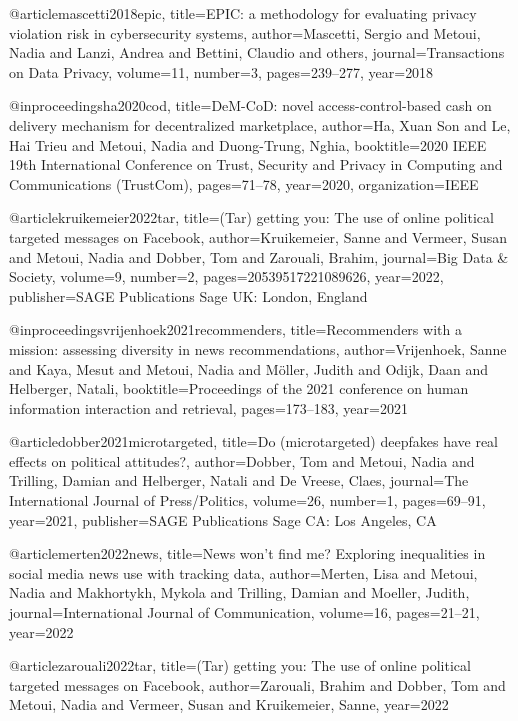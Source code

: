 @article{mascetti2018epic,
  title={EPIC: a methodology for evaluating privacy violation risk in cybersecurity systems},
  author={Mascetti, Sergio and Metoui, Nadia and Lanzi, Andrea and Bettini, Claudio and others},
  journal={Transactions on Data Privacy},
  volume={11},
  number={3},
  pages={239--277},
  year={2018}
}

@inproceedings{ha2020cod,
  title={DeM-CoD: novel access-control-based cash on delivery mechanism for decentralized marketplace},
  author={Ha, Xuan Son and Le, Hai Trieu and Metoui, Nadia and Duong-Trung, Nghia},
  booktitle={2020 IEEE 19th International Conference on Trust, Security and Privacy in Computing and Communications (TrustCom)},
  pages={71--78},
  year={2020},
  organization={IEEE}
}

@article{kruikemeier2022tar,
  title={(Tar) getting you: The use of online political targeted messages on Facebook},
  author={Kruikemeier, Sanne and Vermeer, Susan and Metoui, Nadia and Dobber, Tom and Zarouali, Brahim},
  journal={Big Data \& Society},
  volume={9},
  number={2},
  pages={20539517221089626},
  year={2022},
  publisher={SAGE Publications Sage UK: London, England}
}

@inproceedings{vrijenhoek2021recommenders,
  title={Recommenders with a mission: assessing diversity in news recommendations},
  author={Vrijenhoek, Sanne and Kaya, Mesut and Metoui, Nadia and M{\"o}ller, Judith and Odijk, Daan and Helberger, Natali},
  booktitle={Proceedings of the 2021 conference on human information interaction and retrieval},
  pages={173--183},
  year={2021}
}

@article{dobber2021microtargeted,
  title={Do (microtargeted) deepfakes have real effects on political attitudes?},
  author={Dobber, Tom and Metoui, Nadia and Trilling, Damian and Helberger, Natali and De Vreese, Claes},
  journal={The International Journal of Press/Politics},
  volume={26},
  number={1},
  pages={69--91},
  year={2021},
  publisher={SAGE Publications Sage CA: Los Angeles, CA}
}

@article{merten2022news,
  title={News won’t find me? Exploring inequalities in social media news use with tracking data},
  author={Merten, Lisa and Metoui, Nadia and Makhortykh, Mykola and Trilling, Damian and Moeller, Judith},
  journal={International Journal of Communication},
  volume={16},
  pages={21--21},
  year={2022}
}

@article{zarouali2022tar,
  title={(Tar) getting you: The use of online political targeted messages on Facebook},
  author={Zarouali, Brahim and Dobber, Tom and Metoui, Nadia and Vermeer, Susan and Kruikemeier, Sanne},
  year={2022}
}

